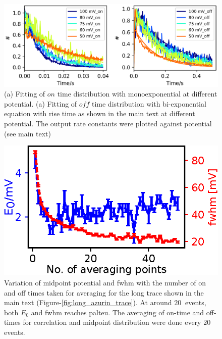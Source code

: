 \documentclass[11pt,a4paper,onecolumn]{article}
\begin{document}
\begin{figure}
  \centering
  \includegraphics{rate_fit_all_potential.eps}
  \makeatletter
  \renewcommand{\fnum@figure}{\figurename~S\thefigure}
  \makeatother
  \caption{(a) Fitting of $on$ time distribution with monoexponential at different potential.
  (a) Fitting of $off$ time distribution with bi-exponential equation with rise time as shown in the main text at different potential.
  The output rate constants were plotted against potential (see main text)}
  \label{SIfig: rate_fit_all_potential}
\end{figure}
\begin{figure}
  \centering
  \includegraphics[scale=1.5]{N_avgpoints_vs_fwhmwidth.eps}
  \makeatletter
  \renewcommand{\fnum@figure}{\figurename~S\thefigure}
  \makeatother
  \caption{Variation of midpoint potential and fwhm with the number of on and off times taken for averaging for the long trace shown in the main text (Figure-\ref{fig:long_azurin_trace}). At around $20~$ events, both $E_0$ and fwhm reaches palteu.
  The averaging of on-time and off-times for correlation and midpoint distribution were done every $20$ events.}
  \label{SIfig: N_avgpoints_vs_fwhmwidth}
\end{figure}
\end{document}
